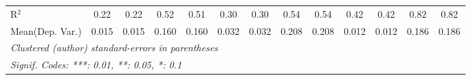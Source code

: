 \begin{tabular}{lcccccccccccc}
   R$^2$                                    & 0.22           & 0.22           & 0.52         & 0.51    & 0.30           & 0.30          & 0.54           & 0.54           & 0.42          & 0.42        & 0.82          & 0.82\\  
Mean(Dep. Var.) & 0.015 & 0.015 & 0.160 & 0.160 & 0.032 & 0.032 & 0.208 & 0.208 & 0.012 & 0.012 & 0.186 & 0.186 \\
   \midrule \midrule
   \multicolumn{13}{l}{\emph{Clustered (author) standard-errors in parentheses}}\\
   \multicolumn{13}{l}{\emph{Signif. Codes: ***: 0.01, **: 0.05, *: 0.1}}\\
\end{tabular}
\par\endgroup
